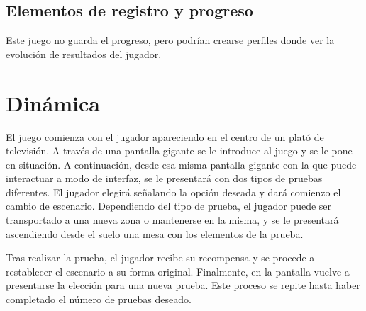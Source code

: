 \subsection{Elementos de registro y progreso}
Este juego no guarda el progreso, pero podrían crearse perfiles donde ver la evolución de resultados del jugador.





\section{Dinámica}
El juego comienza con el jugador apareciendo en el centro de un plató de televisión. A través de una pantalla gigante se le introduce al juego y se le pone en situación. A continuación, desde esa misma pantalla gigante con la que puede interactuar a modo de interfaz, se le presentará con dos tipos de pruebas diferentes. El jugador elegirá señalando la opción deseada y dará comienzo el cambio de escenario. Dependiendo del tipo de prueba, el jugador puede ser transportado a una nueva zona o mantenerse en la misma, y se le presentará ascendiendo desde el suelo una mesa con los elementos de la prueba. 

Tras realizar la prueba, el jugador recibe su recompensa y se procede a restablecer el escenario a su forma original. Finalmente, en la pantalla vuelve a presentarse la elección para una nueva prueba. Este proceso se repite hasta haber completado el número de pruebas deseado.


